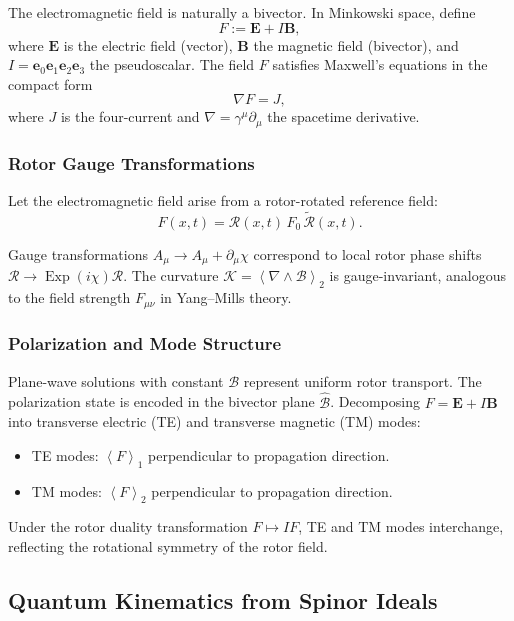 \documentclass[11pt,a4paper]{article}
\newcommand{\e}{\mathbf{e}}
\newcommand{\grade}[2]{\left\langle #1 \right\rangle_{#2}}
\newcommand{\vecp}[1]{\grade{#1}{1}}
\newcommand{\biv}[1]{\grade{#1}{2}}
\newcommand{\rev}[1]{\widetilde{#1}}           %
\newcommand{\Exp}{\operatorname{Exp}}
\newcommand{\Rotor}{\mathcal{R}}
\newcommand{\Biv}{\mathcal{B}}
\newcommand{\D}{\nabla}                        %
\theoremstyle{definition}
\theoremstyle{plain}
\theoremstyle{remark}
\begin{document}
The electromagnetic field is naturally a bivector. In Minkowski space, define
\begin{equation}
F := \mathbf{E} + I\mathbf{B},
\end{equation}
where $\mathbf{E}$ is the electric field (vector), $\mathbf{B}$ the magnetic field (bivector), and $I = \e_0\e_1\e_2\e_3$ the pseudoscalar. The field $F$ satisfies Maxwell's equations in the compact form
\begin{equation}
\D F = J,
\end{equation}
where $J$ is the four-current and $\D = \gamma^\mu \partial_\mu$ the spacetime derivative.

\subsubsection{Rotor Gauge Transformations}

Let the electromagnetic field arise from a rotor-rotated reference field:
\begin{equation}
F(x,t) = \Rotor(x,t)\, F_0\, \rev{\Rotor}(x,t).
\end{equation}

Gauge transformations $A_\mu \to A_\mu + \partial_\mu \chi$ correspond to local rotor phase shifts $\Rotor \to \Exp(i\chi)\Rotor$. The curvature $\mathcal{K} = \biv{\D \wedge \Biv}$ is gauge-invariant, analogous to the field strength $F_{\mu\nu}$ in Yang--Mills theory.

\subsubsection{Polarization and Mode Structure}

Plane-wave solutions with constant $\Biv$ represent uniform rotor transport. The polarization state is encoded in the bivector plane $\hat{\Biv}$. Decomposing $F = \mathbf{E} + I\mathbf{B}$ into transverse electric (TE) and transverse magnetic (TM) modes:
\begin{itemize}
  \item TE modes: $\vecp{F}$ perpendicular to propagation direction.
  \item TM modes: $\biv{F}$ perpendicular to propagation direction.
\end{itemize}

Under the rotor duality transformation $F \mapsto IF$, TE and TM modes interchange, reflecting the rotational symmetry of the rotor field.

\subsection{Quantum Kinematics from Spinor Ideals}
\end{document}

